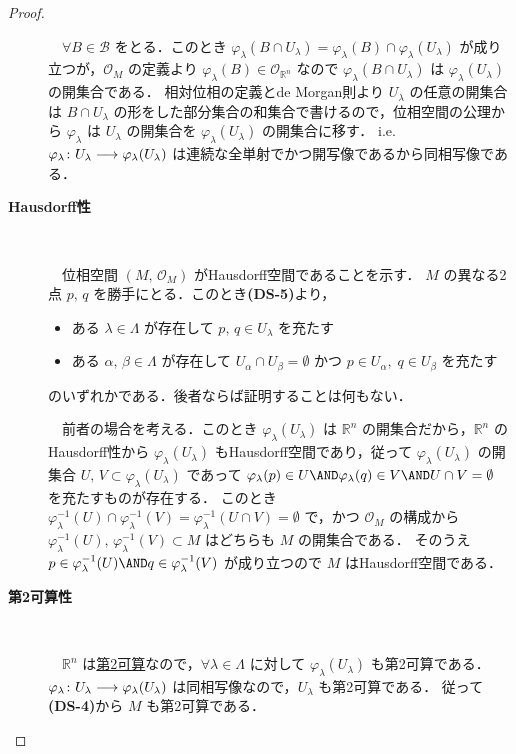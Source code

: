 \documentclass[geometry_main]{subfiles}
\begin{document}
\begin{proof}
\begin{description}
		　$\forall B \in \mathscr{B}$ をとる．このとき $\varphi_\lambda(B \cap U_\lambda) = \varphi_\lambda(B) \cap \varphi_\lambda(U_\lambda)$ が成り立つが，$\mathscr{O}_M$ の定義より $\varphi_\lambda(B) \in \mathscr{O}_{\mathbb{R}^n}$ なので $\varphi_\lambda(B \cap U_\lambda)$ は $\varphi_\lambda(U_\lambda)$ の開集合である．
		相対位相の定義とde Morgan則より $U_\lambda$ の任意の開集合は $B \cap U_\lambda$ の形をした部分集合の和集合で書けるので，位相空間の公理から $\varphi_\lambda$ は $U_\lambda$ の開集合を $\varphi_\lambda(U_\lambda)$ の開集合に移す．
		i.e. $\varphi_\lambda \colon U_\lambda \longrightarrow \varphi_\lambda(U_\lambda)$ は連続な全単射でかつ開写像であるから同相写像である．

		\item[\textbf{Hausdorff性}]　
		
		　位相空間 $(M,\, \mathscr{O}_M)$ がHausdorff空間であることを示す．
		$M$ の異なる2点 $p,\, q$ を勝手にとる．このとき\textsf{\textbf{(DS-5)}}より，
		\begin{itemize}
			\item ある $\lambda \in \Lambda$ が存在して $p,\, q \in U_\lambda$ を充たす
			\item ある $\alpha,\, \beta \in \Lambda$ が存在して $U_\alpha \cap U_\beta = \emptyset$ かつ $p \in U_\alpha,\; q \in U_\beta$ を充たす
		\end{itemize}
		のいずれかである．後者ならば証明することは何もない．

		　前者の場合を考える．このとき $\varphi_\lambda(U_\lambda)$ は $\mathbb{R}^n$ の開集合だから，$\mathbb{R}^n$ のHausdorff性から $\varphi_\lambda(U_\lambda)$ もHausdorff空間であり，従って $\varphi_\lambda(U_\lambda)$ の開集合 $U,\, V \subset \varphi_\lambda(U_\lambda)$ であって $\varphi_\lambda(p) \in U \AND \varphi_\lambda(q) \in V \AND U \cap V = \emptyset$ を充たすものが存在する．
		このとき $\varphi_\lambda^{-1}(U) \cap \varphi_\lambda^{-1}(V) = \varphi^{-1}_\lambda(U\cap V) = \emptyset$ で，かつ $\mathscr{O}_M$ の構成から $\varphi_\lambda^{-1}(U),\, \varphi_\lambda^{-1}(V) \subset M$ はどちらも $M$ の開集合である．
		そのうえ $p \in \varphi_\lambda^{-1}(U) \AND q \in \varphi_\lambda^{-1}(V)$ が成り立つので $M$ はHausdorff空間である．

		\item[\textbf{第2可算性}]　
		
		　$\mathbb{R}^n$ は\hyperref[def:second-countable]{第2可算}なので，$\forall \lambda \in \Lambda$ に対して $\varphi_\lambda(U_\lambda)$ も第2可算である．$\varphi_\lambda \colon U_\lambda \longrightarrow \varphi_\lambda (U_\lambda)$ は同相写像なので，$U_\lambda$ も第2可算である．
		従って\textsf{\textbf{(DS-4)}}から $M$ も第2可算である．
	\end{description}
	

\end{proof}
\end{document}

